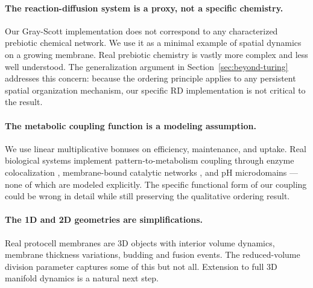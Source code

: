 \documentclass[11pt,letterpaper]{article}
\begin{document}
\paragraph{The reaction-diffusion system is a proxy, not a specific chemistry.} Our Gray-Scott implementation does not correspond to any characterized prebiotic chemical network. We use it as a minimal example of spatial dynamics on a growing membrane. Real prebiotic chemistry is vastly more complex and less well understood. The generalization argument in Section~\ref{sec:beyond-turing} addresses this concern: because the ordering principle applies to any persistent spatial organization mechanism, our specific RD implementation is not critical to the result.

\paragraph{The metabolic coupling function is a modeling assumption.} We use linear multiplicative bonuses on efficiency, maintenance, and uptake. Real biological systems implement pattern-to-metabolism coupling through enzyme colocalization \citep{agapakis2012natural}, membrane-bound catalytic networks \citep{lane2015vital,martin2007origin}, and pH microdomains --- none of which are modeled explicitly. The specific functional form of our coupling could be wrong in detail while still preserving the qualitative ordering result.

\paragraph{The 1D and 2D geometries are simplifications.} Real protocell membranes are 3D objects with interior volume dynamics, membrane thickness variations, budding and fusion events. The reduced-volume division parameter captures some of this but not all. Extension to full 3D manifold dynamics is a natural next step.
\end{document}

